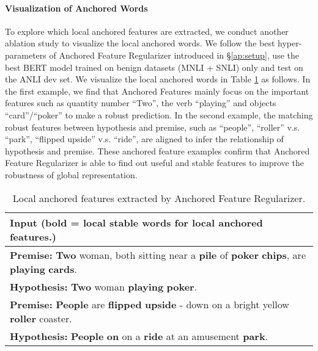 \documentclass{article} \usepackage{iclr2021_conference,times}
\theoremstyle{definition}
\theoremstyle{remark}
\begin{document}
\paragraph{Visualization of Anchored Words} To explore which local anchored features are extracted, we conduct another ablation study to visualize the local anchored words. We follow the best hyper-parameters of Anchored Feature Regularizer introduced in \S\ref{ap:setup}, use the best BERT model trained on benign datasets (MNLI + SNLI) only and test on the ANLI dev set. We visualize the local anchored words in Table \ref{tab:ablation_anchor} as follows. In the first example, we find that Anchored Features mainly focus on the important features such as quantity number ``Two'', the verb ``playing'' and objects ``card''/``poker'' to make a robust prediction. In the second example, the matching robust features between hypothesis and premise, such as ``people'', ``roller'' v.s. ``park'', ``flipped upside'' v.s. ``ride'', are aligned to infer the relationship of hypothesis and premise. These anchored feature examples confirm that Anchored Feature Regularizer is able to find out useful and stable features to improve the robustness of global representation.

\begin{table}[htp!]\small \setlength{\tabcolsep}{7pt}
\centering
\begin{tabular}{p{13.8cm}}
\toprule Input (\textbf{bold} = local stable words for local anchored features.) \\
\midrule
\textbf{Premise:} \textbf{Two} woman, both sitting near a \textbf{pile} of \textbf{poker} \textbf{chips}, are \textbf{playing} \textbf{cards}.  \\
\textbf{Hypothesis:} \textbf{Two} woman \textbf{playing} \textbf{poker}.  \\
\midrule
\textbf{Premise:} \textbf{People} are \textbf{flipped} \textbf{upside} - down on a bright yellow \textbf{roller} coaster.  \\
\textbf{Hypothesis:} \textbf{People} \textbf{on} on a \textbf{ride} at an amusement \textbf{park}.  \\
\bottomrule
\end{tabular}
\caption{Local anchored features extracted by Anchored Feature Regularizer.}
\label{tab:ablation_anchor}
\end{table}
\end{document}
